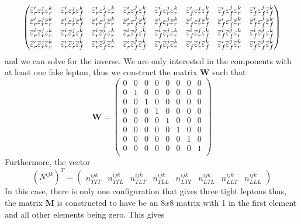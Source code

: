 \begin{align}
\begin{pmatrix}
  \realbar^i\real^j\real^k  &
  \realbar^i\real^j\fake^k  &
  \realbar^i\fake^j\real^k  &
  \realbar^i\fake^j\fake^k  &
  \fakebar^i\real^j\real^k  &
  \fakebar^i\real^j\fake^k  &
  \fakebar^i\fake^j\real^k  &
  \fakebar^i\fake^j\fakebar^k  \\
  \realbar^i\real^j\realbar^k  &
  \realbar^i\real^j\fakebar^k  &
  \realbar^i\fake^j\realbar^k  &
  \realbar^i\fake^j\fakebar^k  &
  \fakebar^i\real^j\realbar^k  &
  \fakebar^i\real^j\fakebar^k  &
  \fakebar^i\fake^j\realbar^k  &
  \fakebar^i\fake^j\fakebar^k  \\
  \realbar^i\realbar^j\real^k  &
  \realbar^i\realbar^j\fake^k  &
  \realbar^i\fakebar^j\real^k  &
  \realbar^i\fakebar^j\fake^k  &
  \fakebar^i\realbar^j\real^k  &
  \fakebar^i\realbar^j\fake^k  &
  \fakebar^i\fakebar^j\real^k  &
  \fakebar^i\fakebar^j\fake^k  \\
  \realbar^i\realbar^j\realbar^k  &
  \realbar^i\realbar^j\fakebar^k  &
  \realbar^i\fakebar^j\realbar^k  &
  \realbar^i\fakebar^j\fakebar^k  &
  \fakebar^i\realbar^j\realbar^k  &
  \fakebar^i\realbar^j\fakebar^k  &
  \fakebar^i\fakebar^j\realbar^k  &
  \fakebar^i\fakebar^j\fakebar^k  
  \end{pmatrix} 
\end{align}
and we can solve for the inverse.  
We are only interested in the components with at least one
fake lepton, thus we construct the matrix $\mathbf{W}$ such that:
\begin{equation}
\mathbf{W} = 
\begin{pmatrix}
0 & 0 & 0 & 0 & 0 & 0 & 0 & 0 \\
0 & 1 & 0 & 0 & 0 & 0 & 0 & 0 \\
0 & 0 & 1 & 0 & 0 & 0 & 0 & 0 \\
0 & 0 & 0 & 1 & 0 & 0 & 0 & 0 \\
0 & 0 & 0 & 0 & 1 & 0 & 0 & 0 \\
0 & 0 & 0 & 0 & 0 & 1 & 0 & 0 \\
0 & 0 & 0 & 0 & 0 & 0 & 1 & 0 \\
0 & 0 & 0 & 0 & 0 & 0 & 0 & 1 \\
\end{pmatrix}
\end{equation}
Furthermore, the vector 
\begin{equation}
(N^{ijk})^T=\begin{pmatrix} 
  n_{TTT}^{ijk}&
  n_{TTL}^{ijk}&
  n_{TLT}^{ijk}&
  n_{TLL}^{ijk}&
  n_{LTT}^{ijk}&
  n_{LTL}^{ijk}&
  n_{LLT}^{ijk}&
  n_{LLL}^{ijk}
  \end{pmatrix}
\end{equation}
In this case, there is only one configuration that gives 
three tight leptons thus, the matrix $\mathbf{M}$ is constructed
to have be an $8x8$ matrix with 1 in the first element and 
all other elements being zero. This gives 

